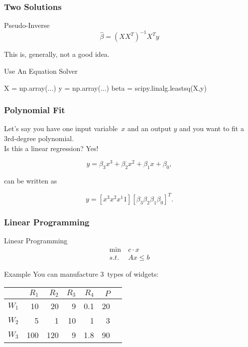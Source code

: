 \begin{frame}[fragile]
\frametitle{Two Solutions}

\begin{block}{Pseudo-Inverse}
\[
\hat{\beta} = (X X^T)^{-1}X^T y
\]
\end{block}

This is, generally, not a good idea.
\pause
\begin{block}{Use An Equation Solver}
\begin{python}
X = np.array(...)
y = np.array(...)
beta = scipy.linalg.leastsq(X,y)
\end{python}
\end{block}
\end{frame}

\begin{frame}[fragile]
\frametitle{Polynomial Fit}

Let's say you have one input variable~$x$ and an output $y$ and you want to fit a 3rd-degree polynomial.\\
Is this a linear regression?
\pause
Yes!

\[
y = \beta_3 x^3 + \beta_2 x^2 + \beta_1 x + \beta_0,
\]

can be written as

\[
y = [ x^3 x^2 x^1 1] [\beta_3 \beta_2 \beta_1 \beta_0 ]^{T}.
\]
\end{frame}

\begin{frame}[fragile]
\frametitle{Linear Programming}
\begin{block}{Linear Programming}
\begin{align*}
\min & c\cdot x\\
s.t.\,\,\,& Ax \le b
\end{align*}
\end{block}

\begin{block}{Example}
You can manufacture 3~types of widgets:
\begin{tabular}{lrrrrrr}
\toprule
      & $R_1$ & $R_2$ & $R_3$ & $R_4$ & $P$ \\
\midrule                      
$W_1$ &   10  &   20  &    9  &  0.1  & 20  \\
$W_2$ &    5  &    1  &   10  &    1  &  3  \\
$W_3$ &  100  &  120  &    9  &  1.8  & 90  \\
\bottomrule
\end{tabular}
\end{block}
\end{frame}

